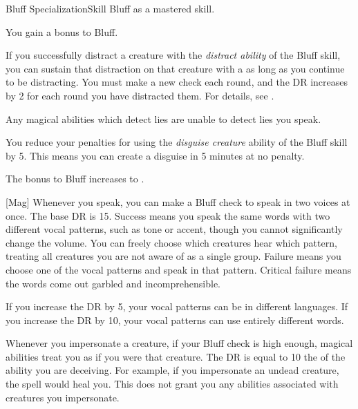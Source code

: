     \begin{feat}{Bluff Specialization}{Skill}
        \featpre Bluff as a mastered skill.
        \featben

         You gain a  bonus to Bluff.

         If you successfully distract a creature with the \textit{distract ability} of the Bluff skill, you can sustain that distraction on that creature with a  as long as you continue to be distracting.
        You must make a new check each round, and the DR increases by 2 for each round you have distracted them.
        For details, see .

         Any magical abilities which detect lies are unable to detect lies you speak.

         You reduce your penalties for using the \textit{disguise creature} ability of the Bluff skill by 5.
        This means you can create a disguise in 5 minutes at no penalty.


         The bonus to Bluff increases to .

        [Mag] Whenever you speak, you can make a Bluff check to speak in two voices at once.
        The base DR is 15.
        Success means you speak the same words with two different vocal patterns, such as tone or accent, though you cannot significantly change the volume.
        You can freely choose which creatures hear which pattern, treating all creatures you are not aware of as a single group.
        Failure means you choose one of the vocal patterns and speak in that pattern.
        Critical failure means the words come out garbled and incomprehensible.

        If you increase the DR by 5, your vocal patterns can be in different languages.
        If you increase the DR by 10, your vocal patterns can use entirely different words.

         Whenever you impersonate a creature, if your Bluff check is high enough, magical abilities treat you as if you were that creature.
        The DR is equal to 10 \add the  of the ability you are deceiving.
        For example, if you impersonate an undead creature, the  spell would heal you.
        This does not grant you any abilities associated with creatures you impersonate.


\end{feat}

